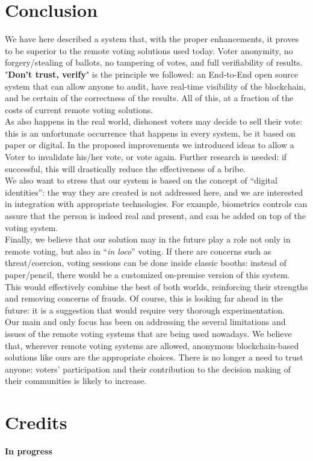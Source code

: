 \documentclass[10pt, letterpaper]{article}
\begin{document}
\section{Conclusion}
We have here described a system that, with the proper enhancements, it proves to be superior to the remote voting solutions used today. Voter anonymity, no forgery/stealing of ballots, no tampering of votes, and full verifiability of results. "\textbf{Don’t trust, verify}" is the principle we followed: an End-to-End open source system that can allow anyone to audit, have real-time visibility of the blockchain, and be certain of the correctness of the results. All of this, at a fraction of the costs of current remote voting solutions.\\
As also happens in the real world, dishonest voters may decide to sell their vote: this is an unfortunate occurrence that happens in every system, be it based on paper or digital. In the proposed improvements we introduced ideas to allow a Voter to invalidate his/her vote, or vote again. Further research is needed: if successful, this will drastically reduce the effectiveness of a bribe.\\
We also want to stress that our system is based on the concept of “digital identities”: the way they are created is not addressed here, and we are interested in integration with appropriate technologies. For example, biometrics controls can assure that the person is indeed real and present, and can be added on top of the voting system.\\
Finally, we believe that our solution may in the future play a role not only in remote voting, but also in “\textit{in loco}” voting. If there are concerns such as threat/coercion, voting sessions can be done inside classic booths: instead of paper/pencil, there would be a customized on-premise version of this system. This would effectively combine the best of both worlds, reinforcing their strengths and removing concerns of frauds. Of course, this is looking far ahead in the future: it is a suggestion that would require very thorough experimentation.\\
Our main and only focus has been on addressing the several limitations and issues of the remote voting systems that are being used nowadays. We believe that, wherever remote voting systems are allowed, anonymous blockchain-based solutions like ours are the appropriate choices. There is no longer a need to trust anyone: voters’ participation and their contribution to the decision making of their communities is likely to increase.
\section{Credits}
\textbf{In progress}



\end{document}
